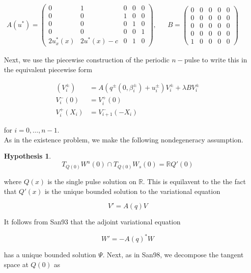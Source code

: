 \documentclass[12pt]{article}
\def\R{{\mathbb R}}
\newtheorem{hypothesis}{Hypothesis}
\begin{document}
\begin{align}
A(u^*) = \begin{pmatrix}0 & 1 & 0 & 0 & 0 \\0 & 0 & 1 & 0 & 0 \\0 & 0 & 0 & 1 & 0 \\0 & 0 & 0 & 0 & 1 \\
2u^*_x(x) & 2u^*(x) - c & 0 & 1 & 0 \end{pmatrix}, &&
B = \begin{pmatrix}0 & 0 & 0 & 0 & 0 \\0 & 0 & 0 & 0 & 0 \\0  & 0 & 0 & 0 & 0 \\0 & 0 & 0 & 0 & 0 \\1 & 0 & 0 & 0 & 0 \end{pmatrix} && 
\end{align}

Next, we use the piecewise construction of the periodic $n-$pulse to write this in the equivalent piecewise form

\begin{align*}
(V_i^\pm) &= A( q^\pm(0, \beta_i^\pm) + u_i^\pm) V_i^\pm + \lambda B V_i^\pm \\
V_i^-(0) &= V_i^+(0) \\
V_i^+(X_i) &= V_{i+1}^-(-X_i) 
\end{align*}

for $i = 0, \dots, n-1$. \\

As in the existence problem, we make the following nondegeneracy assumption.

\begin{hypothesis}
\[
T_{Q(0)} W^u(0) \cap T_{Q(0)} W_s(0) = \R Q'(0)
\]
\end{hypothesis}

where $Q(x)$ is the single pulse solution on $\R$. This is equilavent to the the fact that $Q'(x)$ is the unique bounded solution to the variational equation

\begin{equation}
V' = A(q)V
\end{equation}

It follows from San93 that the adjoint variational equation

\begin{equation}
W' = -A(q)^*W
\end{equation}

has a unique bounded solution $\Psi$. Next, as in San98, we decompose the tangent space at $Q(0)$ as
\end{document}
